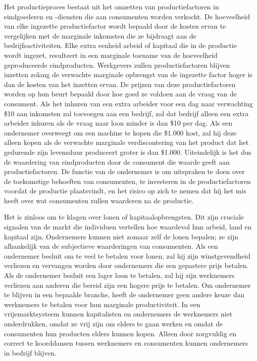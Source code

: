 Het productieproces bestaat uit het omzetten van productiefactoren in eindgoederen en -diensten die aan consumenten worden verkocht. De hoeveelheid van elke ingezette productiefactor wordt bepaald door de kosten ervan te vergelijken met de marginale inkomsten die ze bijdraagt aan de bedrijfsactiviteiten. Elke extra eenheid arbeid of kapitaal die in de productie wordt ingezet, resulteert in een marginale toename van de hoeveelheid geproduceerde eindproducten. Werkgevers zullen productiefactoren blijven inzetten zolang de verwachte marginale opbrengst van de ingezette factor hoger is dan de kosten van het inzetten ervan. De prijzen van deze productiefactoren worden op hun beurt bepaald door hoe goed ze voldoen aan de vraag van de consument. Als het inhuren van een extra arbeider voor een dag naar verwachting \$10 aan inkomsten zal toevoegen aan een bedrijf, zal dat bedrijf alleen een extra arbeider inhuren als de vraag naar loon minder is dan \$10 per dag. Als een ondernemer overweegt om een machine te kopen die \$1.000 kost, zal hij deze alleen kopen als de verwachte marginale verdiscontering van het product dat het gedurende zijn levensduur produceert groter is dan \$1.000. Uiteindelijk is het dus de waardering van eindproducten door de consument die waarde geeft aan productiefactoren. De functie van de ondernemer is om uitspraken te doen over de toekomstige behoeften van consumenten, te investeren in de productiefactoren voordat de productie plaatsvindt, en het risico op zich te nemen dat hij het mis heeft over wat consumenten zullen waarderen na de productie.

Het is zinloos om te klagen over lonen of kapitaalopbrengsten. Dit zijn cruciale signalen van de markt die individuen vertellen hoe waardevol hun arbeid, land en kapitaal zijn. Ondernemers kunnen niet zomaar zelf de lonen bepalen; ze zijn afhankelijk van de subjectieve waarderingen van consumenten. Als een ondernemer besluit om te veel te betalen voor lonen, zal hij zijn winstgevendheid verliezen en vervangen worden door ondernemers die een gepastere prijs betalen. Als de ondernemer besluit een lager loon te betalen, zal hij zijn werknemers verliezen aan anderen die bereid zijn een hogere prijs te betalen. Om ondernemer te blijven in een bepaalde branche, heeft de ondernemer geen andere keuze dan werknemers te betalen voor hun marginale productiviteit. In een vrijemarktsysteem kunnen kapitalisten en ondernemers de werknemers niet onderdrukken, omdat ze vrij zijn om elders te gaan werken en omdat de consumenten hun producten elders kunnen kopen. Alleen door zorgvuldig en correct te koorddansen tussen werknemers en consumenten kunnen ondernemers in bedrijf blijven.

